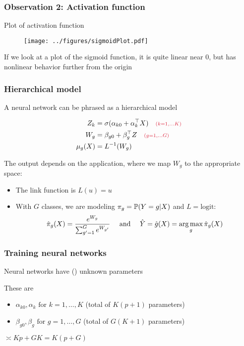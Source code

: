 \documentclass[12pt]{beamer}
\newcommand{\parenthetical}[2]{#1  \scriptstyle \alr{( #2)}}
\begin{document}
\begin{frame}[fragile]
\frametitle{Observation 2: Activation function}
Plot of  activation function
\begin{figure}
\centering
\texttt{[image: ../figures/sigmoidPlot.pdf]}
\end{figure}
If we look at a plot of the sigmoid function, it is quite linear near 0, but has nonlinear behavior further from the origin

\end{frame}


\begin{frame}[fragile]
\frametitle{Hierarchical model}
A neural network can be phrased as a hierarchical model

\begin{align*}
Z_k   & = \sigma(\alpha_{k0} + \alpha_k^{\top}X) \parenthetical{\quad}{k = 1, \ldots K} \\
W_g & = \beta_{g0} + \beta_g^{\top}Z \parenthetical{\quad}{g = 1, \ldots G} \\
\mu_g(X) & = L^{-1}(W_g)
\end{align*}

The output depends on the application, where we map $W_g$ to the appropriate space:

\begin{itemize}
\item {} The link function is $L(u) = u$

\item {} With $G$ classes, we are modeling $\pi_g = \P(Y = g|X)$ and $L = \textrm{logit}$:
\[
 \hat{\pi}_g(X) = \frac{e^{W_g}}{\sum_{g'=1}^Ge^{W_{g'}}} \quad \textrm{ and } \quad \hat{Y} = \hat{g}(X) = \argmax_g \hat{\pi}_g(X)
\]
\end{itemize}
\end{frame}

\begin{frame}[fragile]
\frametitle{Training neural networks}
Neural networks have  () unknown parameters


\vsp
These are
\begin{itemize}
\item $\alpha_{k0}, \alpha_k \textrm{ for } k = 1,\ldots,K$ (total of $K(p+1)$ parameters)
\item $\beta_{g0}, \beta_g \textrm{ for } g = 1,\ldots,G$ (total of $G(K+1)$ parameters)
\end{itemize}
\vsp

 $\asymp Kp + GK = K(p + G)$
\end{frame}
\end{document}
